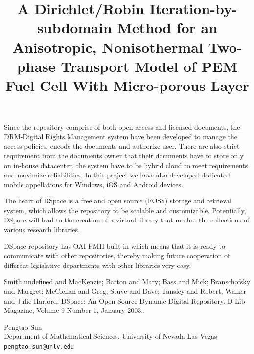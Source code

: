 \documentclass[article,A4,11pt]{llncs}%
\begin{document}
Since the repository comprise of both open-access and licensed documents, the DRM-Digital Rights Management system have been developed to manage the access policies, encode the documents and authorize user. There are also strict requirement from the documents owner that their documents have to store only on in-house datacenter, the system have to be hybrid cloud to meet requirements and maximize reliabilities. In this project we have also developed dedicated mobile appellations for Windows, iOS and Android devices. 

The heart of DSpace is a free and open source (FOSS) storage and retrieval system, which allows the repository to be scalable and customizable. Potentially, DSpace will lead to the creation of a virtual library that meshes the collections of various research libraries. 

DSpace repository has OAI-PMH built-in which means that it is ready to communicate with other repositories, thereby making future cooperation of different legislative departments with other libraries very easy.



\begin{thebibliography}{10}
{\sc Smith undefined and MacKenzie; Barton and Mary; Bass and Mick; Branschofsky and Margret; McClellan and Greg; Stuve and Dave; Tansley and Robert; Walker and Julie Harford}. {DSpace: An Open Source Dynamic Digital Repository}. D-Lib Magazine, Volume 9 Number 1, January 2003..
\end{thebibliography}

\title{A Dirichlet/Robin Iteration-by-subdomain Method for an Anisotropic, Nonisothermal Two-phase Transport Model of PEM Fuel Cell With Micro-porous Layer}
 \author{} \institute{}
\maketitle
\begin{center}
{\large Pengtao Sun}\\
Department of Mathematical Sciences, University of Nevada Las Vegas\\
{\tt pengtao.sun@unlv.edu}
\end{center}
\end{document}
